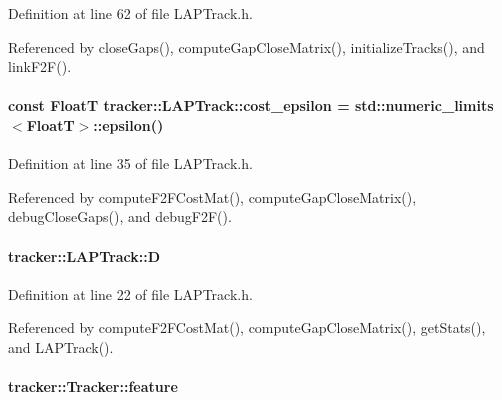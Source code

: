 Definition at line 62 of file L\+A\+P\+Track.\+h.



Referenced by close\+Gaps(), compute\+Gap\+Close\+Matrix(), initialize\+Tracks(), and link\+F2\+F().

\paragraph[{\texorpdfstring{cost\+\_\+epsilon}{cost_epsilon}}]{\setlength{\rightskip}{0pt plus 5cm}const {\bf FloatT} tracker\+::\+L\+A\+P\+Track\+::cost\+\_\+epsilon = std\+::numeric\+\_\+limits$<${\bf FloatT}$>$\+::epsilon()}\hypertarget{classtracker_1_1LAPTrack_a7e64b62f96af123e349ce5ba7801cced}{}\label{classtracker_1_1LAPTrack_a7e64b62f96af123e349ce5ba7801cced}


Definition at line 35 of file L\+A\+P\+Track.\+h.



Referenced by compute\+F2\+F\+Cost\+Mat(), compute\+Gap\+Close\+Matrix(), debug\+Close\+Gaps(), and debug\+F2\+F().

\paragraph[{\texorpdfstring{D}{D}}]{ tracker\+::\+L\+A\+P\+Track\+::D}\hypertarget{classtracker_1_1LAPTrack_aeb0584b18f32b86e395de5a973108187}{}\label{classtracker_1_1LAPTrack_aeb0584b18f32b86e395de5a973108187}


Definition at line 22 of file L\+A\+P\+Track.\+h.



Referenced by compute\+F2\+F\+Cost\+Mat(), compute\+Gap\+Close\+Matrix(), get\+Stats(), and L\+A\+P\+Track().

\paragraph[{\texorpdfstring{feature}{feature}}]{ tracker\+::\+Tracker\+::feature\hspace{0.3cm}{\ttfamily [inherited]}}\hypertarget{classtracker_1_1Tracker_ab9d6c09e4ae84ff482cd21cc32878138}{}\label{classtracker_1_1Tracker_ab9d6c09e4ae84ff482cd21cc32878138}


